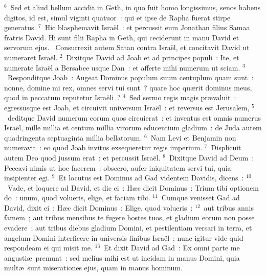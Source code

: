 ${}^{6}$~Sed et aliud bellum accidit in Geth, in quo fuit homo longissimus, senos habens digitos, id est, simul viginti quatuor~: qui et ipse de Rapha fuerat stirpe generatus.
${}^{7}$~Hic blasphemavit Isra\"el~: et percussit eum Jonathan filius Samaa fratris David. Hi sunt filii Rapha in Geth, qui ceciderunt in manu David et servorum ejus.
~Consurrexit autem Satan contra Isra\"el, et concitavit David ut numeraret Isra\"el.
${}^{2}$~Dixitque David ad Joab et ad principes populi~: Ite, et numerate Isra\"el a Bersabee usque Dan~: et afferte mihi numerum ut sciam.
${}^{3}$~Responditque Joab~: Augeat Dominus populum suum centuplum quam sunt~: nonne, domine mi rex, omnes servi tui sunt~? quare hoc qu\ae rit dominus meus, quod in peccatum reputetur Isra\"eli~?
${}^{4}$~Sed sermo regis magis pr\ae valuit~: egressusque est Joab, et circuivit universum Isra\"el~: et reversus est Jerusalem,
${}^{5}$~deditque David numerum eorum quos circuierat~: et inventus est omnis numerus Isra\"el, mille millia et centum millia virorum educentium gladium~: de Juda autem quadringenta septuaginta millia bellatorum.
${}^{6}$~Nam Levi et Benjamin non numeravit~: eo quod Joab invitus exsequeretur regis imperium.
${}^{7}$~Displicuit autem Deo quod jussum erat~: et percussit Isra\"el.
${}^{8}$~Dixitque David ad Deum~: Peccavi nimis ut hoc facerem~: obsecro, aufer iniquitatem servi tui, quia insipienter egi.
${}^{9}$~Et locutus est Dominus ad Gad videntem Davidis, dicens~:
${}^{10}$~Vade, et loquere ad David, et dic ei~: H\ae c dicit Dominus~: Trium tibi optionem do~: unum, quod volueris, elige, et faciam tibi.
${}^{11}$~Cumque venisset Gad ad David, dixit ei~: H\ae c dicit Dominus~: Elige, quod volueris~:
${}^{12}$~aut tribus annis famem~; aut tribus mensibus te fugere hostes tuos, et gladium eorum non posse evadere~; aut tribus diebus gladium Domini, et pestilentiam versari in terra, et angelum Domini interficere in universis finibus Isra\"el~: nunc igitur vide quid respondeam ei qui misit me.
${}^{13}$~Et dixit David ad Gad~: Ex omni parte me angusti\ae\ premunt~: sed melius mihi est ut incidam in manus Domini, quia mult\ae\ sunt miserationes ejus, quam in manus hominum.


